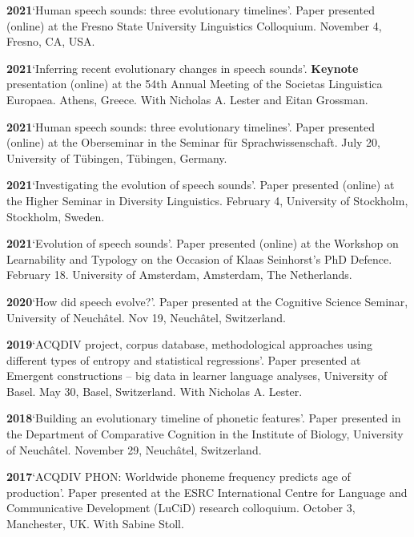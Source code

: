 \documentclass[11pt]{article}
\newcommand{\hangpara}{
 \setlength{\parindent}{0in} %
 \hangindent=0.42in %
}
\begin{document}
\vskip 6pt
\hangpara
{\bf 2021}\hspace{1ex}`Human speech sounds: three evolutionary timelines'. Paper presented (online) at the Fresno State University Linguistics Colloquium. November 4, Fresno, CA, USA.

\vskip 6pt
\hangpara
{\bf 2021}\hspace{1ex}`Inferring recent evolutionary changes in speech sounds'. \textbf{Keynote} presentation (online) at the 54th Annual Meeting of the Societas Linguistica Europaea. Athens, Greece. With Nicholas A. Lester and Eitan Grossman.

\vskip 6pt
\hangpara
{\bf 2021}\hspace{1ex}`Human speech sounds: three evolutionary timelines'. Paper presented (online) at the Oberseminar in the Seminar für Sprachwissenschaft. July 20, University of Tübingen, Tübingen, Germany.

\vskip 6pt
\hangpara
{\bf 2021}\hspace{1ex}`Investigating the evolution of speech sounds'. Paper presented (online) at the Higher Seminar in Diversity Linguistics. February 4, University of Stockholm, Stockholm, Sweden.

\vskip 6pt
\hangpara
{\bf 2021}\hspace{1ex}`Evolution of speech sounds'. Paper presented (online) at the Workshop on Learnability and Typology
on the Occasion of Klaas Seinhorst’s PhD Defence. February 18. University of Amsterdam, Amsterdam, The Netherlands.

\vskip 6pt
\hangpara
{\bf 2020}\hspace{1ex}`How did speech evolve?'. Paper presented at the Cognitive Science Seminar, University of Neuchâtel. Nov 19, Neuchâtel, Switzerland.

\vskip 6pt
\hangpara
{\bf 2019}\hspace{1ex}`ACQDIV project, corpus database, methodological approaches using different types of entropy and statistical regressions'. Paper presented at Emergent constructions -- big data in learner language analyses, University of Basel. May 30, Basel, Switzerland. With Nicholas A. Lester.

\vskip 6pt
\hangpara
{\bf 2018}\hspace{1ex}`Building an evolutionary timeline of phonetic features'. Paper presented in the Department of Comparative Cognition in the Institute of Biology, University of Neuchâtel. November 29, Neuchâtel, Switzerland.

\vskip 6pt
\hangpara
{\bf 2017}\hspace{1ex}`ACQDIV PHON: Worldwide phoneme frequency predicts age of production'. Paper presented at the ESRC International Centre for Language and Communicative Development (LuCiD) research colloquium. October 3, Manchester, UK. With Sabine Stoll.
\end{document}
